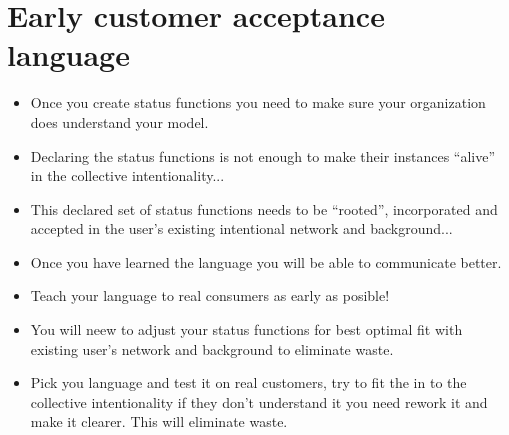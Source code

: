 \section{Early customer acceptance language}
\begin{itemize}
    \item Once you create status functions you need to make sure your organization does understand your model.
    \item Declaring the status functions is not enough to make their instances ``alive'' in the collective intentionality... 
    \item This declared set of status functions needs to be ``rooted'', incorporated and accepted in the user's existing intentional network and background... 
    \item Once you have learned the language you will be able to communicate better.
    \item Teach your language to real consumers as early as posible! 
    \item You will neew to adjust your status functions for best optimal fit with existing user's network and background to eliminate waste.
    \item Pick you language and test it on real customers, try to fit the in to the collective intentionality if they don't understand it you need rework it and make it clearer. This will eliminate waste. 
\end{itemize}


